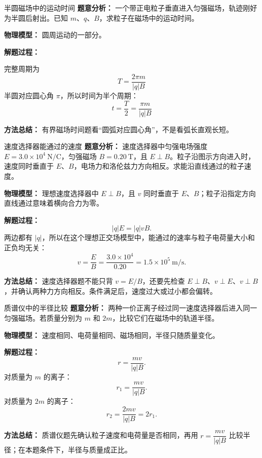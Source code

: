 \begin{examplebox}{半圆磁场中的运动时间}
\textbf{题意分析：} 一个带正电粒子垂直进入匀强磁场，轨迹刚好为半圆后射出。已知 $m$、$q$、$B$，求粒子在磁场中的运动时间。

\textbf{物理模型：} 圆周运动的一部分。

\begin{center}

\end{center}

\textbf{解题过程：}

完整周期为
\[
T=\frac{2\pi m}{|q|B}
\]
半圆对应圆心角 $\pi$，所以时间为半个周期：
\[
t=\frac{T}{2}=\frac{\pi m}{|q|B}
\]

\textbf{方法总结：} 有界磁场时间题看“圆弧对应圆心角”，不是看弧长直观长短。
\end{examplebox}

\begin{examplebox}{速度选择器能通过的速度}
\textbf{题意分析：} 速度选择器中匀强电场强度 $E=3.0\times10^4\ \mathrm{N/C}$，匀强磁场 $B=0.20\ \mathrm{T}$，且 $E\perp B$。粒子沿图示方向进入时，速度同时垂直于 $E$、$B$，电场力和洛伦兹力方向相反。求能沿直线通过的粒子速度。

\textbf{物理模型：} 理想速度选择器中 $E\perp B$，且 $v$ 同时垂直于 $E$、$B$；粒子沿指定方向直线通过意味着横向合力为零。

\begin{center}

\end{center}

\textbf{解题过程：}
\[
|q|E=|q|vB.
\]
两边都有 $|q|$，所以在这个理想正交场模型中，能通过的速率与粒子电荷量大小和正负均无关：
\[
v=\frac{E}{B}
=\frac{3.0\times10^4}{0.20}
=1.5\times10^5\ \mathrm{m/s}.
\]

\textbf{方法总结：} 速度选择器题不能只背 $v=E/B$，还要先检查 $E\perp B$、$v\perp E$、$v\perp B$，并确认两种力方向相反。条件满足后，速度过大或过小都会偏转。
\end{examplebox}

\begin{examplebox}{质谱仪中的半径比较}
\textbf{题意分析：} 两种一价正离子经过同一速度选择器后进入同一匀强磁场。若质量分别为 $m$ 和 $2m$，比较它们在磁场中的轨道半径。

\textbf{物理模型：} 速度相同、电荷量相同、磁场相同，半径只随质量变化。

\begin{center}

\end{center}

\textbf{解题过程：}
\[
r=\frac{mv}{|q|B}.
\]
对质量为 $m$ 的离子：
\[
r_1=\frac{mv}{|q|B}.
\]
对质量为 $2m$ 的离子：
\[
r_2=\frac{2mv}{|q|B}=2r_1.
\]

\textbf{方法总结：} 质谱仪题先确认粒子速度和电荷量是否相同，再用 $r=\dfrac{mv}{|q|B}$ 比较半径；在本题条件下，半径与质量成正比。
\end{examplebox}

